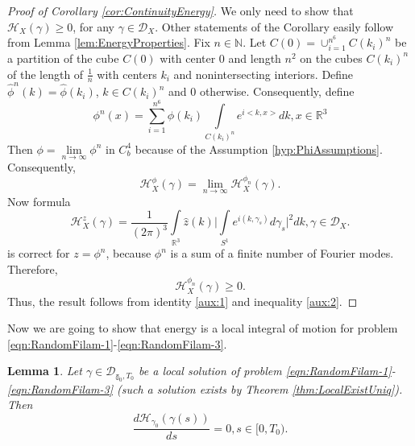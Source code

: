 \documentclass[11pt,a4paper,leqno]{amsart}%
\theoremstyle{plain}
\theoremstyle{remark}
\theoremstyle{plain}
\newtheorem{lemma}[theorem]{Lemma}
\numberwithin{equation}{section}
\def\Rnu{{\mathbb R}}
\def\suml{\sum\limits}
\def\intl{\int\limits}
\begin{document}
\begin{proof}[Proof of Corollary \ref{cor:ContinuityEnergy}]
We only need to show that $\mathcal{H}_X(\gamma)\geq 0$, for any
$\gamma\in\mathcal{D}_X$. Other statements of the Corollary easily
follow from Lemma \ref{lem:EnergyProperties}.
Fix $n\in \mathbb{N}$.
Let $C(0)=\cup_{i=1}^{n^6}C(k_i)^n$ be a partition of the cube $C(0)$ with center $0$ and length $n^2$ on the cubes $C(k_i)^n$ of the length of $\frac{1}{n}$ with centers $k_i$ and nonintersecting interiors. Define $\hat{\phi}^n(k)=\hat{\phi}(k_i)$, $k\in C(k_i)^n$ and $0$ otherwise. Consequently, define
\[
\phi^n(x)=\suml_{i=1}^{n^6}\hat{\phi}(k_i)\int\limits_{C(k_i)^n}e^{i<k,x>}dk,x\in\mathbb{R}^3
\]
Then $\phi=\lim\limits_{n\to\infty}\phi^n$ in $C_b^4$  because of the Assumption \ref{hyp:PhiAssumptions}.
Consequently,
\begin{equation}
\mathcal{H}_X^{\phi}(\gamma)=\lim\limits_{n\to\infty}\mathcal{H}_X^{\phi_n}(\gamma).\label{aux:1}
\end{equation}
Now formula
\begin{equation}
\mathcal{H}_X^{z}(\gamma)=\frac{1}{(2\pi)^3}\intl_{\Rnu^3}\hat{z}(k)\Big\vert \intl_{S^1}e^{i(k,\gamma_s)}d\gamma_s\Big\vert^2dk,\gamma\in
\mathcal{D}_X.\label{eqn:EnergyIntegralRepr-1}
\end{equation}
is correct for $z=\phi^n$, because $\phi^n$ is a sum of a finite number of Fourier modes. Therefore,
\begin{equation}
\mathcal{H}_X^{\phi_n}(\gamma)\geq 0.\label{aux:2}
\end{equation}
Thus, the  result follows from identity \eqref{aux:1} and inequality \eqref{aux:2}.
\end{proof}
Now we are going to show that energy is a local integral of motion
for problem \eqref{eqn:RandomFilam-1}-\eqref{eqn:RandomFilam-3}.
\begin{lemma}\label{lem:EnergyMotionIntegral}
Let $\gamma\in\mathcal{D}_{\mathbb{\gamma}_0,T_0}$ be a local solution of
problem \eqref{eqn:RandomFilam-1}-\eqref{eqn:RandomFilam-3} (such a solution exists by Theorem \ref{thm:LocalExistUniq}). Then
$$
\frac{d\mathcal{H}_{\gamma_0}(\gamma(s))}{ds}=0,s\in[0,T_0).
$$
\end{lemma}
\end{document}
